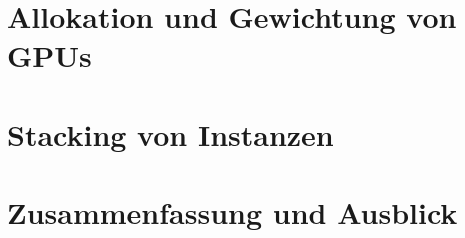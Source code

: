 \documentclass[ngerman, a4paper, 12pt, oneside]{article}
\numberwithin{equation}{section} %
\begin{document}
\section{Allokation und Gewichtung von GPUs}
	
\clearpage

\section{Stacking von Instanzen}
	
\clearpage

\section{Zusammenfassung und Ausblick}
	
\clearpage

\newpage
{}
\renewcommand\refname{Quellen} %
{ %
}

\newpage
{}
{}
\listoffigures

\newpage
{}
{}
\listoftables
\end{document}
